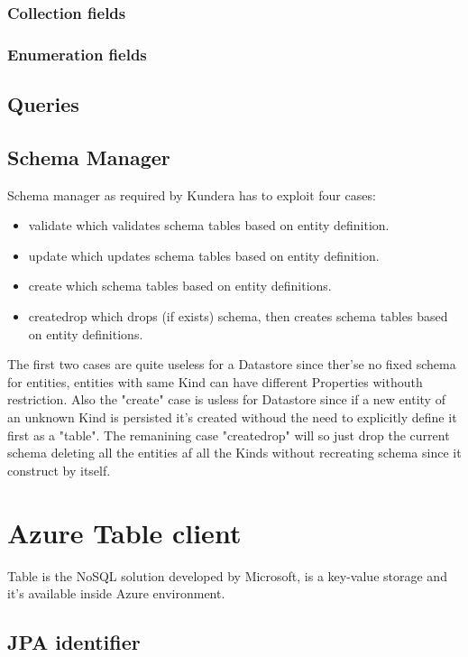 \subsubsection{Collection fields}

\subsubsection{Enumeration fields}

\subsection{Queries}

\subsection{Schema Manager}
Schema manager as required by Kundera has to exploit four cases:
\begin{itemize}
\item validate which validates schema tables based on entity definition.
\item update which updates schema tables based on entity definition.
\item create which schema tables based on entity definitions.
\item create\textunderscore drop which drops (if exists) schema, then creates schema tables based on entity definitions.
\end{itemize}
The first two cases are quite useless for a Datastore since ther'se no fixed schema for entities, entities with same Kind can have different Properties withouth restriction.
Also the "create" case is usless for Datastore since if a new entity of an unknown Kind is persisted it's created withoud the need to explicitly define it first as a "table".
The remanining case "create\textunderscore drop" will so just drop the current schema deleting all the entities af all the Kinds without recreating schema since it construct by itself.

\section{Azure Table client}
\label{sec:kundera-table}
Table is the NoSQL solution developed by Microsoft, is a key-value storage and it's available inside Azure environment.

\subsection{JPA identifier}

